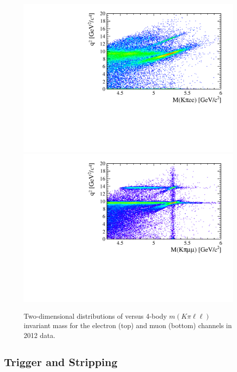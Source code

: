 \begin{figure}[t!]
\centering 
\includegraphics[width=1.\textwidth]{RKst/figs/electron_B0jpsi2D_selected.pdf}
\includegraphics[width=1.\textwidth]{RKst/figs/muon_B0jpsi2D_selected.pdf}
\caption{Two-dimensional distributions of \qsq versus 4-body $m(K\pi\ell\ell)$
invariant mass for the electron (top) and muon (bottom) channels in 2012 data.}
\label{fig:2D_q2_B0mass}
\end{figure}


\subsection{Trigger and Stripping }
\label{sec:RKst_trigstripping}

